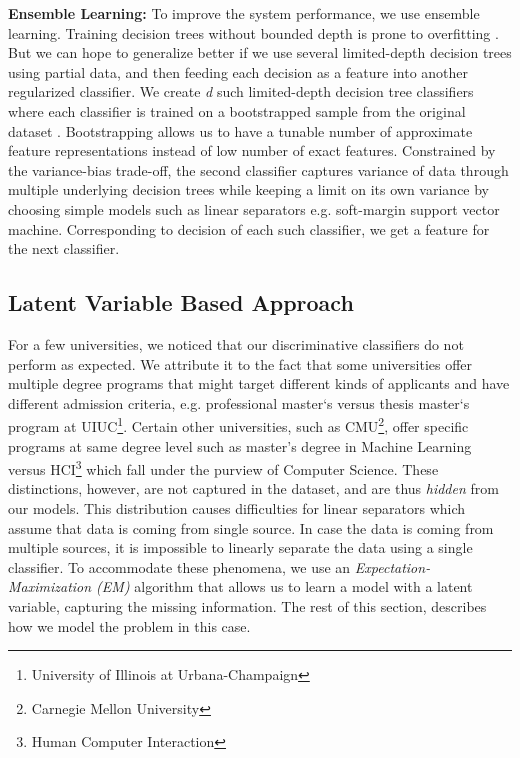 \documentclass{sig-alternate-05-2015}
\begin{document}
\textbf{Ensemble Learning:}
To improve the system performance, we use ensemble learning. Training decision trees without bounded depth is prone to overfitting \cite{decision-tree-original, tree-overfitting}. But we can hope to generalize better if we use several limited-depth decision trees using partial data, and then feeding each decision as a feature into another regularized classifier. We create \textit{d} such limited-depth decision tree classifiers where each classifier is trained on a bootstrapped sample from the original dataset \cite{bootstrapping}. Bootstrapping allows us to have a tunable number of approximate feature representations instead of low number of exact features. Constrained by the variance-bias trade-off, the second classifier captures variance of data through multiple underlying decision trees while keeping a limit on its own variance by choosing simple models such as linear separators e.g. soft-margin support vector machine. Corresponding to decision of each such classifier, we get a feature for the next classifier.


\subsection{Latent Variable Based Approach}
\label{subsec:generative-modeling}
For a few universities, we noticed that our discriminative classifiers do not perform as expected. We attribute it to the fact that some universities offer multiple degree programs that might target different kinds of applicants and have different admission criteria, e.g. professional master`s versus thesis master`s program at UIUC\footnote{University of Illinois at Urbana-Champaign}. Certain other universities, such as CMU\footnote{Carnegie Mellon University}, offer specific programs at same degree level such as master's degree in Machine Learning versus HCI\footnote{Human Computer Interaction} which fall under the purview of Computer Science. These distinctions, however, are not captured in the dataset, and are thus \textit{hidden} from our models. This distribution causes difficulties for linear separators which assume that data is coming from single source. In case the data is coming from multiple sources, it is impossible to linearly separate the data using a single classifier. To accommodate these phenomena, we use an \textit{Expectation-Maximization (EM)} algorithm that allows us to learn a model with a latent variable, capturing the missing information. The rest of this section, describes how we model the problem in this case.
\end{document}
